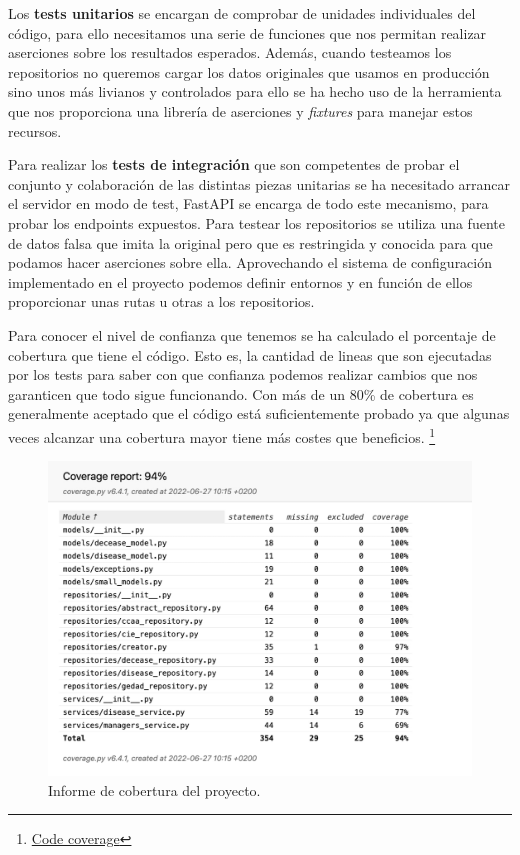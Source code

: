 Los \textbf{tests unitarios} se encargan de comprobar de unidades individuales del código,
para ello necesitamos una serie de funciones que nos permitan realizar aserciones sobre
los resultados esperados. Además, cuando testeamos los repositorios no queremos cargar los
datos originales que usamos en producción sino unos más livianos y controlados para ello
se ha hecho uso de la herramienta  que nos proporciona una librería de
aserciones y \textit{fixtures} para manejar estos recursos.

Para realizar los \textbf{tests de integración} que son competentes de probar el conjunto
y colaboración de las distintas piezas unitarias se ha necesitado arrancar el servidor en
modo de test, FastAPI se encarga de todo este mecanismo, para probar los endpoints
expuestos. Para testear los repositorios se utiliza una fuente de datos falsa que imita la
original pero que es restringida y conocida para que podamos hacer aserciones sobre ella.
Aprovechando el sistema de configuración implementado en el proyecto podemos definir
entornos y en función de ellos proporcionar unas rutas u otras a los repositorios.

Para conocer el nivel de confianza que tenemos se ha calculado el porcentaje de cobertura
que tiene el código. Esto es, la cantidad de lineas que son ejecutadas por los tests para
saber con que confianza podemos realizar cambios que nos garanticen que todo sigue
funcionando. Con más de un 80\% de cobertura es generalmente aceptado que el código está
suficientemente probado ya que algunas veces alcanzar una cobertura mayor tiene más costes
que beneficios.
\footnote{\href{https://www.atlassian.com/continuous-delivery/software-testing/code-coverage}{Code
coverage}}

\FloatBarrier
\begin{figure}[h]
	\centering	
	\includegraphics[width=\textwidth]{doc/logos/imgs/cobertura.jpg}
    \caption{ Informe de cobertura del proyecto.}
    \label{fig:cobertura-tests}
\end{figure}
\FloatBarrier


